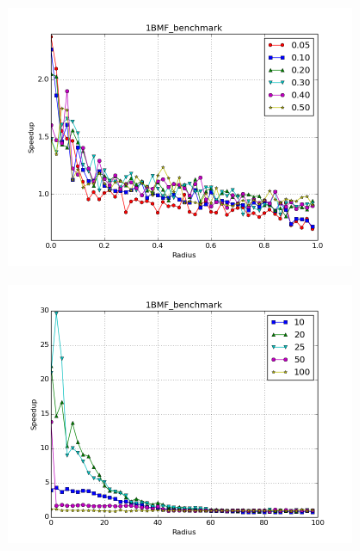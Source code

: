 \documentclass[review,preprint,12pt]{elsarticle}
\theoremstyle{definition}
\theoremstyle{remark}
\numberwithin{equation}{section}
\begin{document}
\begin{figure}[tbp]
\begin{subfigure}[b]{0.40\textwidth}
        \includegraphics[width=1\textwidth]{assets/1BMF_benchmark_cosine}
    \end{subfigure}%
    \begin{subfigure}[b]{0.40\textwidth}
        \includegraphics[width=1\textwidth]{assets/1BMF_benchmark_euclid}
    \end{subfigure}
    \begin{subfigure}[b]{0.40\textwidth}

\end{subfigure}
\end{figure}
\end{document}
